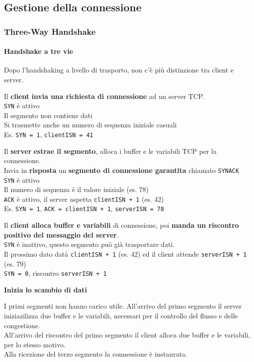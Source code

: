 \documentclass[10pt]{article}
\begin{document}
\subsection{Gestione della connessione}
\subsubsection{Three-Way Handshake}
\paragraph{Handshake a tre vie} Dopo l'handshaking a livello di trasporto, non c'è più distinzione tra client e server. \begin{list}{-}{Sequenza:}
\item Il \textbf{client} \textbf{invia una richiesta di connessione} ad un server TCP.\\
\texttt{SYN} è attivo\\
Il segmento non contiene dati\\
Si trasmette anche un numero di sequenza iniziale casuali\\
Es. \texttt{SYN = 1}, \texttt{clientISN = 41}
\item Il \textbf{server} \textbf{estrae il segmento}, alloca i buffer e le variabili TCP per la connessione.\\
Invia in \textbf{risposta} un \textbf{segmento di connessione garantita} chiamato \texttt{SYNACK}\\
\texttt{SYN} è attivo\\
Il numero di sequenza è il valore iniziale (es. 78)\\
\texttt{ACK} è attivo, il server aspetta \texttt{clientISN + 1} (es. 42)\\
Es. \texttt{SYN = 1}, \texttt{ACK = clientISN + 1}, \texttt{serverISN = 78}
\item Il \textbf{client} \textbf{alloca buffer e variabili} di connessione, poi \textbf{manda un riscontro positivo del messaggio del server}.\\
\texttt{SYN} è inattivo, questo segmento può già trasportare dati.\\
Il prossimo dato datà \texttt{clientISN + 1} (es. 42) ed il client attende \texttt{serverISN + 1} (es. 79)\\
\texttt{SYN = 0}, riscontro \texttt{serverISN + 1}\\
\item \textbf{Inizia lo scambio di dati}
\end{list}
I primi segmenti non hanno carico utile. All'arrivo del primo segmento il server iniziazilizza due buffer e le variabili, necessari per il controllo del flusso e delle congestione.\\
All'arrivo del riscontro del primo segmento il client alloca due buffer e le variabili, per lo stesso motivo.\\
Alla ricezione del terzo segmento la connessione è instaurata.
\pagebreak
\end{document}
